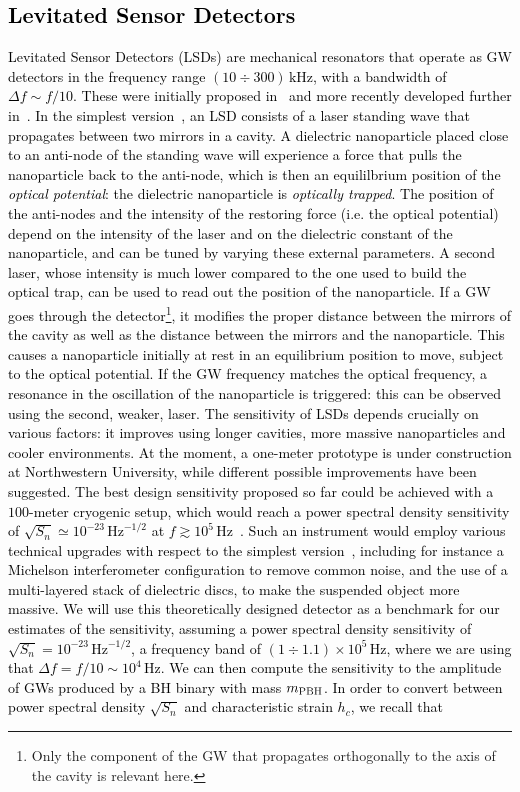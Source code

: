 \documentclass[11pt,a4paper]{article}
\begin{document}
\textcolor{black}{
\subsection{Levitated Sensor Detectors}
\label{sec:lsd}
Levitated Sensor Detectors (LSDs) are mechanical resonators that operate as GW detectors in the frequency range $(10 \div 300) \, \text{kHz}$, with a bandwidth of $\Delta f \sim f/10$. These were initially proposed in~\cite{Arvanitaki:2012cn} and more recently developed further in~\cite{Aggarwal:2020umq}. In the simplest version~\cite{Arvanitaki:2012cn}, an LSD consists of a laser standing wave that propagates between two mirrors in a cavity. A dielectric nanoparticle placed close to an anti-node of the standing wave will experience a force that pulls the nanoparticle back to the anti-node, which is then an equililbrium position of the \textit{optical potential}: the dielectric nanoparticle is \textit{optically trapped}. The position of the anti-nodes and the intensity of the restoring force (i.e. the optical potential) depend on the intensity of the laser and on the dielectric constant of the nanoparticle, and can be tuned by varying these external parameters. A second laser, whose intensity is much lower compared to the one used to build the optical trap, can be used to read out the position of the nanoparticle. If a GW goes through the detector\footnote{Only the component of the GW that propagates orthogonally to the axis of the cavity is relevant here.}, it modifies the proper distance between the mirrors of the cavity as well as the distance between the mirrors and the nanoparticle. This causes a nanoparticle initially at rest in an equilibrium position to move, subject to the optical potential. If the GW frequency matches the optical frequency, a resonance in the oscillation of the nanoparticle is triggered: this can be observed using the second, weaker, laser. The sensitivity of LSDs depends crucially on various factors: it improves using longer cavities, more massive nanoparticles and cooler environments. At the moment, a one-meter prototype is under construction at Northwestern University, while different possible improvements have been suggested. The best design sensitivity proposed so far could be achieved with a $100$-meter cryogenic setup, which would reach a power spectral density sensitivity of $\sqrt{S_n} \simeq 10^{-23} \, \text{Hz}^{-1/2}$ at $f \gtrsim 10^5 \, \text{Hz}$~\cite{Aggarwal:2020umq}. Such an instrument would employ various technical upgrades with respect to the simplest version~\cite{Aggarwal:2020umq}, including for instance a Michelson interferometer configuration to remove common noise, and the use of a multi-layered stack of dielectric discs, to make the suspended object more massive. We will use this theoretically designed detector as a benchmark for our estimates of the sensitivity, assuming a power spectral density sensitivity of $\sqrt{S_n} = 10^{-23} \, \text{Hz}^{-1/2}$, a frequency band of $(1 \div 1.1) \times 10^5 \, \text{Hz}$, where we are using that $\Delta f = f/10 \sim 10^4 \, \text{Hz}$. We can then compute the sensitivity to the amplitude of GWs produced by a BH binary with mass $m_{\rm PBH}$. In order to convert between power spectral density $\sqrt{S_n}$ and characteristic strain $h_c$, we recall that
}
\end{document}
